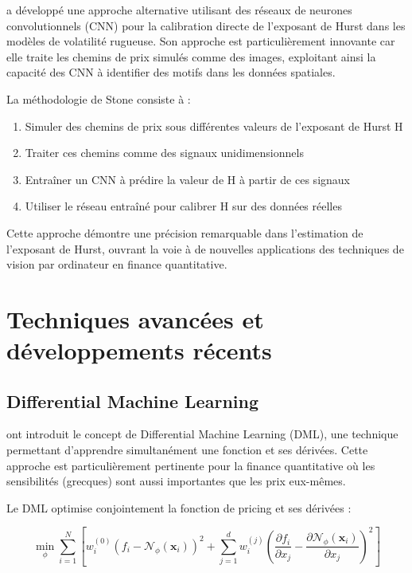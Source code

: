 \citet{stone2020calibrating} a développé une approche alternative utilisant des réseaux de neurones convolutionnels (CNN) pour la calibration directe de l'exposant de Hurst dans les modèles de volatilité rugueuse. Son approche est particulièrement innovante car elle traite les chemins de prix simulés comme des images, exploitant ainsi la capacité des CNN à identifier des motifs dans les données spatiales.

La méthodologie de Stone consiste à :
\begin{enumerate}
\item Simuler des chemins de prix sous différentes valeurs de l'exposant de Hurst H
\item Traiter ces chemins comme des signaux unidimensionnels
\item Entraîner un CNN à prédire la valeur de H à partir de ces signaux
\item Utiliser le réseau entraîné pour calibrer H sur des données réelles
\end{enumerate}

Cette approche démontre une précision remarquable dans l'estimation de l'exposant de Hurst, ouvrant la voie à de nouvelles applications des techniques de vision par ordinateur en finance quantitative.

\section{Techniques avancées et développements récents}

\subsection{Differential Machine Learning}

\citet{huge2020differential} ont introduit le concept de Differential Machine Learning (DML), une technique permettant d'apprendre simultanément une fonction et ses dérivées. Cette approche est particulièrement pertinente pour la finance quantitative où les sensibilités (grecques) sont aussi importantes que les prix eux-mêmes.

Le DML optimise conjointement la fonction de pricing et ses dérivées :

\begin{equation}
\min_\phi \sum_{i=1}^{N} \left[w_i^{(0)}(f_i - \mathcal{N}_\phi(\mathbf{x}_i))^2 + \sum_{j=1}^{d} w_i^{(j)}\left(\frac{\partial f_i}{\partial x_j} - \frac{\partial \mathcal{N}_\phi(\mathbf{x}_i)}{\partial x_j}\right)^2\right]
\end{equation}

